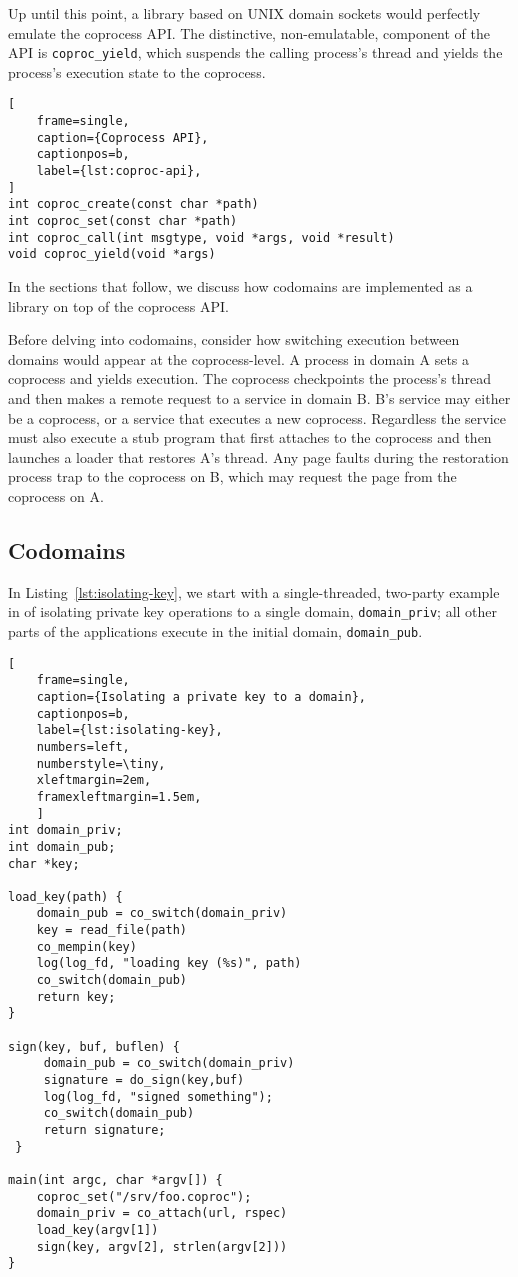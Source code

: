 Up until this point, a library based on UNIX domain sockets would perfectly emulate the
coprocess API\@.
%
The distinctive, non-emulatable, component of the API is \texttt{coproc\_yield},
which suspends the calling process's thread and yields the process's execution
state to the coprocess.

\begin{lstlisting}[
    frame=single, 
    caption={Coprocess API},
    captionpos=b,
    label={lst:coproc-api},
]
int coproc_create(const char *path)
int coproc_set(const char *path)
int coproc_call(int msgtype, void *args, void *result)
void coproc_yield(void *args)
\end{lstlisting}

In the sections that follow, we discuss how codomains are implemented as
a library on top of the coprocess API.


%
Before delving into codomains, consider how switching execution between domains
would appear at the coprocess-level.
%
A process in domain A sets a coprocess and yields execution.
%
The coprocess checkpoints the process's thread and then makes a remote request
to a service in domain B\@.
%
B's service may either be a coprocess, or a service that executes a new
coprocess.
%
Regardless the service must also execute a stub program that first attaches to the
coprocess and then launches a loader that restores A's thread.
%
Any page faults during the restoration process trap to the coprocess on B,
which may request the page from the coprocess on A.


\subsection{Codomains}

In Listing~\ref{lst:isolating-key}, we start with a single-threaded, two-party
example in of isolating private key operations to a single domain,
\texttt{domain\_priv}; all other parts of the applications execute in the
initial domain, \texttt{domain\_pub}.

\begin{lstlisting}[
    frame=single, 
    caption={Isolating a private key to a domain},
    captionpos=b,
    label={lst:isolating-key},
    numbers=left,
    numberstyle=\tiny,
    xleftmargin=2em,
    framexleftmargin=1.5em,
    ]
int domain_priv;
int domain_pub;
char *key;

load_key(path) {
    domain_pub = co_switch(domain_priv)
    key = read_file(path)
    co_mempin(key)
    log(log_fd, "loading key (%s)", path)
    co_switch(domain_pub)
    return key;
}
 
sign(key, buf, buflen) {
     domain_pub = co_switch(domain_priv)
     signature = do_sign(key,buf)
     log(log_fd, "signed something");
     co_switch(domain_pub)
     return signature; 
 }

main(int argc, char *argv[]) {
    coproc_set("/srv/foo.coproc");
    domain_priv = co_attach(url, rspec)
    load_key(argv[1])
    sign(key, argv[2], strlen(argv[2]))
}
\end{lstlisting}



